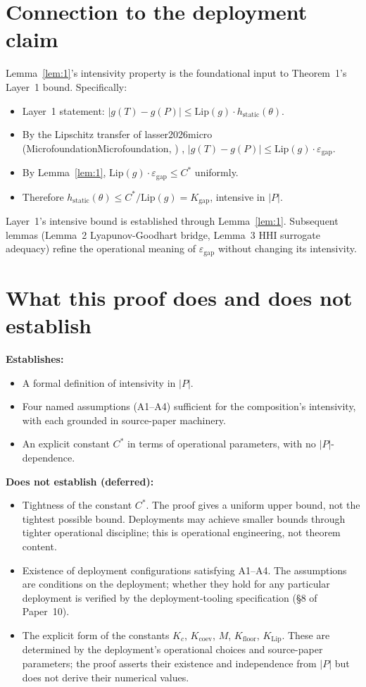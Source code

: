 \documentclass{article}
\makeatletter
\newcommand{\citep}[2][]{%
  \begingroup
  \def\@tmpkey{#2}%
  \ifx\@tmpkey\@empty\else
    (\ifx\@empty#1\@empty\else #1, \fi
     \@nameuse{bibkey@\@tmpkey})%
  \fi
  \endgroup
}
\newcommand{\Pproxy}{P}
\newcommand{\Ttruth}{T}
\newcommand{\epsgap}{\varepsilon_{\mathrm{gap}}}
\makeatother
\begin{document}
\section{Connection to the deployment claim}

Lemma~\ref{lem:1}'s intensivity property is the foundational input
to Theorem~1's Layer~1 bound. Specifically:
\begin{itemize}
\item Layer~1 statement: $|g(\Ttruth) - g(\Pproxy)| \leq
  \mathrm{Lip}(g) \cdot h_{\mathrm{static}}(\theta)$.
\item By the Lipschitz transfer of
  \citep[Microfoundation]{lasser2026micro}, $|g(\Ttruth) -
  g(\Pproxy)| \leq \mathrm{Lip}(g) \cdot \epsgap$.
\item By Lemma~\ref{lem:1}, $\mathrm{Lip}(g) \cdot \epsgap \leq
  C^*$ uniformly.
\item Therefore $h_{\mathrm{static}}(\theta) \leq C^* /
  \mathrm{Lip}(g) = K_{\mathrm{gap}}$, intensive in $|P|$.
\end{itemize}

Layer~1's intensive bound is established through Lemma~\ref{lem:1}.
Subsequent lemmas (Lemma~2 Lyapunov-Goodhart bridge, Lemma~3 HHI
surrogate adequacy) refine the operational meaning of $\epsgap$
without changing its intensivity.

\section{What this proof does and does not establish}

\textbf{Establishes:}
\begin{itemize}
\item A formal definition of intensivity in $|P|$.
\item Four named assumptions (A1--A4) sufficient for the
  composition's intensivity, with each grounded in source-paper
  machinery.
\item An explicit constant $C^*$ in terms of operational
  parameters, with no $|P|$-dependence.
\end{itemize}

\textbf{Does not establish (deferred):}
\begin{itemize}
\item Tightness of the constant $C^*$. The proof gives a uniform
  upper bound, not the tightest possible bound. Deployments may
  achieve smaller bounds through tighter operational discipline;
  this is operational engineering, not theorem content.
\item Existence of deployment configurations satisfying A1--A4.
  The assumptions are conditions on the deployment; whether they
  hold for any particular deployment is verified by the
  deployment-tooling specification (\S8 of Paper~10).
\item The explicit form of the constants $K_c$, $K_{\mathrm{coev}}$,
  $M$, $K_{\mathrm{floor}}$, $K_{\mathrm{Lip}}$. These are determined
  by the deployment's operational choices and source-paper
  parameters; the proof asserts their existence and independence
  from $|P|$ but does not derive their numerical values.
\end{itemize}
\end{document}
